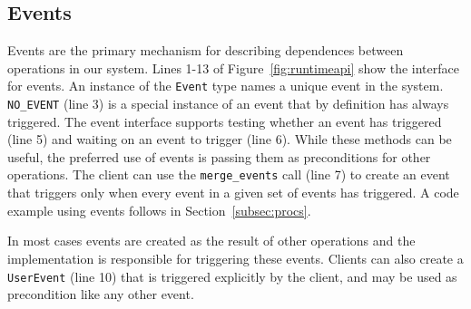 \subsection{Events}
\label{subsec:events}
Events are the primary mechanism for describing dependences between operations in our system.
Lines 1-13 of Figure~\ref{fig:runtimeapi} show the interface for events.  An instance of the {\tt Event} type 
names a unique event in the system.  {\tt NO\_EVENT} (line 3)
is a special instance
of an event that by definition has always triggered.  The event interface
supports testing whether an event has triggered (line 5) and waiting on
an event to trigger (line 6).  While these methods can be useful, the preferred
use of events is passing them as preconditions for other operations.  The client can use the
{\tt merge\_events} call (line 7) to create an event that triggers only when every
event in a given set of events has triggered.  A code example using events follows in
Section~\ref{subsec:procs}.

In most cases events are created as the result of other
operations and the implementation is responsible for triggering these events.  Clients
can also create a {\tt UserEvent} (line 10) that is triggered explicitly by the client,
and may be used as precondition like any other event.



